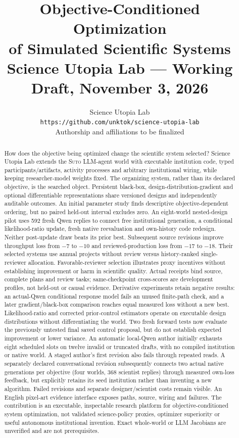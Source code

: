 \documentclass{article}
\title{Objective-Conditioned Optimization\\of Simulated Scientific Systems\\\large Science Utopia Lab --- Working Draft, November 3, 2026}
\author{Science Utopia Lab \\
\texttt{https://github.com/unktok/science-utopia-lab} \\
\textcolor{draftblue}{Authorship and affiliations to be finalized}}
\newcommand{\suto}{\textsc{Suto}}
\begin{document}
\maketitle

\begin{abstract}
How does the objective being optimized change the scientific system selected?
Science Utopia Lab extends the \suto{} LLM-agent world with executable
institution code, typed participants/artifacts, activity processes and arbitrary
institutional wiring, while keeping researcher-model weights fixed. The
organizing system, rather than its declared objective, is the searched object.
Persistent black-box, design-distribution-gradient and optional differentiable
representations share versioned designs and independently auditable outcomes.
An initial parameter study finds descriptive objective-dependent ordering, but
no paired held-out interval excludes zero. An eight-world nested-design pilot uses
592 fresh Qwen replies to connect free institutional generation, a conditional
likelihood-ratio update, fresh native reevaluation and own-history code redesign.
Neither post-update draw beats its prior best. Subsequent source revisions
improve throughput loss from $-7$ to $-10$ and reviewed-production loss from
$-17$ to $-18$. Their selected systems use annual projects without review
versus history-ranked single-reviewer allocation. Favorable-reviewer selection
illustrates proxy incentives without establishing improvement or harm in
scientific quality. Actual receipts bind
source, complete plans and review tasks; same-checkpoint cross-scores are
development profiles, not held-out or causal evidence. Derivative experiments retain negative
results: an actual-Qwen conditional response model fails an unused finite-path
check, and a later gradient/black-box comparison reaches equal measured loss
without a new best. Likelihood-ratio and corrected prior-control estimators
operate on executable design distributions without differentiating the world.
Two fresh forward tests now evaluate the previously untested final saved
control proposal, but do not establish expected improvement or lower variance.
An automatic local-Qwen author initially exhausts eight scheduled slots on twelve
invalid or truncated drafts, with no compiled institution or native world.
A staged author's first revision also fails through repeated reads. A separately
declared conversational revision subsequently connects two actual native
generations per objective (four worlds, 368 scientist replies) through measured
own-loss feedback, but explicitly retains its
seed institution rather than inventing a new algorithm. Failed revisions and
separate designer/scientist costs remain visible. An English
pixel-art evidence interface exposes paths, source, wiring and failures.
The contribution is an executable, inspectable research platform for
objective-conditioned system optimization, not validated science-policy proxies,
optimizer superiority or useful autonomous institutional invention. Exact
whole-world or LLM Jacobians are unverified and are not prerequisites.
\end{abstract}
\end{document}
